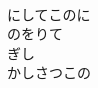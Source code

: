 \documentclass[10pt,b5j]{tarticle} %
\begin{document}
\begin{enumerate}
\begin{minipage}[c]{\blocksize}
        \vspace{\linespace}
        \item~\\
        にしてこのに\\
        のをりて\\
        ぎし\\
        かしさつこの
    
    \end{minipage}
\end{enumerate} %
\end{document}
